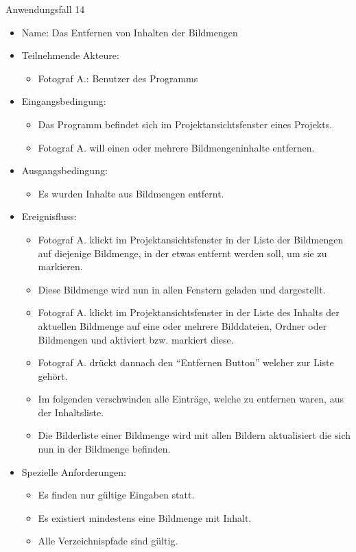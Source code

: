 \begin{itemize}
	\begin{description}
		\item[Anwendungsfall 14]
	\end{description}
	
	\begin{itemize}
		\item Name: Das Entfernen von Inhalten der Bildmengen
		\item Teilnehmende Akteure:
		\begin{itemize}
			\item	Fotograf A.: Benutzer des Programms		
		\end{itemize}
		\item Eingangsbedingung:
		\begin{itemize}
			\item	Das Programm befindet sich im Projektansichtsfenster eines Projekts.
			\item Fotograf A. will einen oder mehrere Bildmengeninhalte entfernen.
		\end{itemize}
		\item Ausgangsbedingung:
		\begin{itemize}
			\item	Es wurden Inhalte aus Bildmengen entfernt.	
		\end{itemize}
		\item Ereignisfluss:
		\begin{itemize}
			\item Fotograf A. klickt im Projektansichtsfenster in der Liste der Bildmengen auf diejenige Bildmenge, in der etwas entfernt werden soll, um sie zu markieren.		
			\item Diese Bildmenge wird nun in allen Fenstern geladen und dargestellt.
			\item Fotograf A. klickt im Projektansichtsfenster in der Liste des Inhalts der aktuellen Bildmenge auf eine oder mehrere Bilddateien, Ordner oder Bildmengen und aktiviert bzw. markiert diese.
			\item Fotograf A. drückt dannach den "`Entfernen Button"' welcher zur Liste gehört.
			\item Im folgenden verschwinden alle Einträge, welche zu entfernen waren, aus der Inhaltsliste.
			\item Die Bilderliste einer Bildmenge wird mit allen Bildern aktualisiert die sich nun in der Bildmenge befinden.
		\end{itemize}
		\item Spezielle Anforderungen:
		\begin{itemize}
			\item	Es finden nur gültige Eingaben statt.
			\item Es existiert mindestens eine Bildmenge mit Inhalt.
			\item Alle Verzeichnispfade sind gültig.
		\end{itemize}			
	\end{itemize}
	

\end{itemize}
